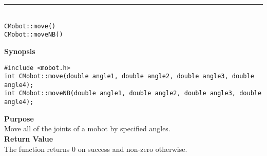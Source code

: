 \noindent
\vspace{5pt}
\rule{4.5in}{0.015in}\\
\noindent
{\LARGE \texttt{CMobot::move()}}\\
{\LARGE \texttt{CMobot::moveNB()}}\\
{}

\noindent
{\bf Synopsis}
\vspace{-8pt}
\begin{verbatim}
#include <mobot.h>
int CMobot::move(double angle1, double angle2, double angle3, double angle4);
int CMobot::moveNB(double angle1, double angle2, double angle3, double angle4);
\end{verbatim}

\noindent
{\bf Purpose}\\
Move all of the joints of a mobot by specified angles.\\

\noindent
{\bf Return Value}\\
The function returns 0 on success and non-zero otherwise.\\

